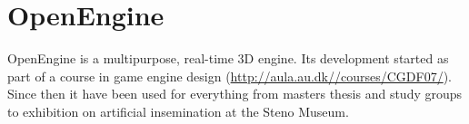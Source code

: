 \section{OpenEngine}

OpenEngine is a multipurpose, real-time 3D engine. Its development
started as part of a course in game engine design
(\url{http://aula.au.dk//courses/CGDF07/}). Since then it have been
used for everything from masters thesis and study groups to exhibition
on artificial insemination at the Steno Museum.




